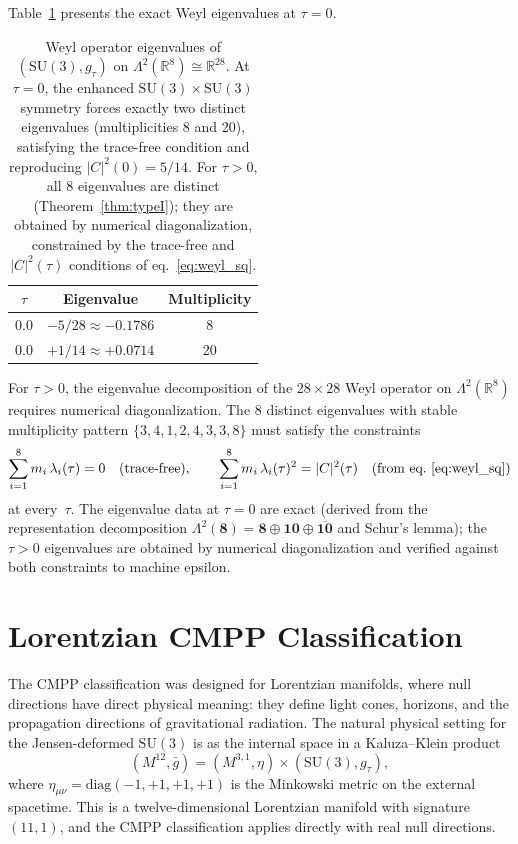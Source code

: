 \documentclass[12pt]{article}
\theoremstyle{definition}
\theoremstyle{remark}
\begin{document}
Table~\ref{tab:weyl_eigenvalues} presents the exact Weyl eigenvalues at $\tau=0$.

\begin{table}[h]
\centering
\small
\begin{tabular}{@{}ccc@{}}
\toprule
$\tau$ & Eigenvalue & Multiplicity \\
\midrule
0.0 & $-5/28 \approx -0.1786$ & 8 \\
0.0 & $+1/14 \approx +0.0714$ & 20 \\
\bottomrule
\end{tabular}
\caption{Weyl operator eigenvalues of $(\mathrm{SU}(3),g_\tau)$ on $\Lambda^2(\mathbb{R}^8)\cong\mathbb{R}^{28}$.  At $\tau=0$, the enhanced $\mathrm{SU}(3)\times\mathrm{SU}(3)$ symmetry forces exactly two distinct eigenvalues (multiplicities 8 and 20), satisfying the trace-free condition and reproducing $|C|^2(0)=5/14$.  For $\tau>0$, all 8 eigenvalues are distinct (Theorem~\ref{thm:typeI}); they are obtained by numerical diagonalization, constrained by the trace-free and $|C|^2(\tau)$ conditions of eq.~\eqref{eq:weyl_sq}.}
\label{tab:weyl_eigenvalues}
\end{table}

For $\tau>0$, the eigenvalue decomposition of the $28\times28$ Weyl operator on $\Lambda^2(\mathbb{R}^8)$ requires numerical diagonalization.  The 8 distinct eigenvalues with stable multiplicity pattern $\{3,4,1,2,4,3,3,8\}$ must satisfy the constraints
\begin{equation}
\sum_{i=1}^{8} m_i\,\lambda_i(\tau) = 0 \quad (\text{trace-free}), \qquad
\sum_{i=1}^{8} m_i\,\lambda_i(\tau)^2 = |C|^2(\tau) \quad (\text{from eq.~\eqref{eq:weyl_sq}})
\end{equation}
at every~$\tau$.  The eigenvalue data at $\tau=0$ are exact (derived from the representation decomposition $\Lambda^2(\mathbf{8})=\mathbf{8}\oplus\mathbf{10}\oplus\overline{\mathbf{10}}$ and Schur's lemma); the $\tau>0$ eigenvalues are obtained by numerical diagonalization and verified against both constraints to machine epsilon.

\section{Lorentzian CMPP Classification}
\label{sec:lorentzian}

The CMPP classification was designed for Lorentzian manifolds, where null directions have direct physical meaning: they define light cones, horizons, and the propagation directions of gravitational radiation.  The natural physical setting for the Jensen-deformed $\mathrm{SU}(3)$ is as the internal space in a Kaluza--Klein product
\begin{equation}
\label{eq:product}
(M^{12},\bar{g}) = (M^{3,1},\eta) \times (\mathrm{SU}(3),g_\tau),
\end{equation}
where $\eta_{\mu\nu}=\mathrm{diag}(-1,+1,+1,+1)$ is the Minkowski metric on the external spacetime.  This is a twelve-dimensional Lorentzian manifold with signature $(11,1)$, and the CMPP classification applies directly with real null directions.
\end{document}
